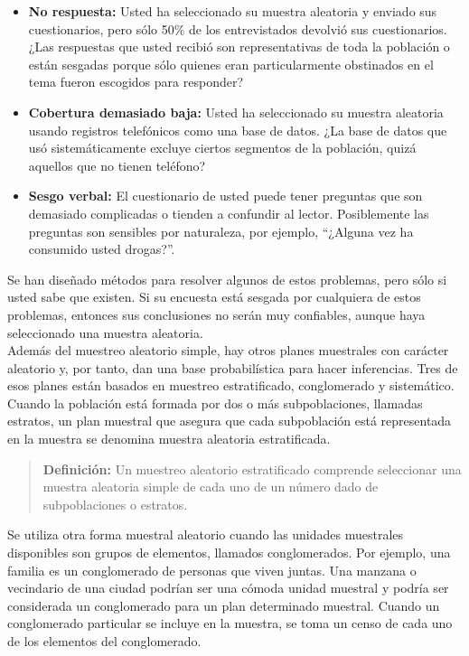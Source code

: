 \documentclass[]{article}
\begin{document}
\begin{itemize}
	\item \textbf{No respuesta:} Usted ha seleccionado su muestra aleatoria y enviado sus cuestionarios, pero sólo 50\% de los entrevistados devolvió sus cuestionarios. ¿Las respuestas que usted recibió son representativas de toda la población o están sesgadas porque sólo quienes eran particularmente obstinados en el tema fueron escogidos para responder?
	\item \textbf{Cobertura demasiado baja:} Usted ha seleccionado su muestra aleatoria usando registros telefónicos como una base de datos. ¿La base de datos que usó sistemáticamente excluye ciertos segmentos de la población, quizá aquellos que no tienen teléfono?
	\item \textbf{Sesgo verbal:} El cuestionario de usted puede tener preguntas que son demasiado complicadas o tienden a confundir al lector. Posiblemente las preguntas son sensibles por naturaleza, por ejemplo, “¿Alguna vez ha consumido usted drogas?”.
\end{itemize}
Se han diseñado métodos para resolver algunos de estos problemas, pero sólo si usted sabe que existen. Si su encuesta está sesgada por cualquiera de estos problemas, entonces sus conclusiones no serán muy confiables, aunque haya seleccionado una muestra aleatoria.
\\ Además del muestreo aleatorio simple, hay otros planes muestrales con carácter aleatorio y, por tanto, dan una base probabilística para hacer inferencias. Tres de esos planes están basados en muestreo estratificado, conglomerado y sistemático.
\\ Cuando la población está formada por dos o más subpoblaciones, llamadas estratos, un plan muestral que asegura que cada subpoblación está representada en la muestra se denomina muestra aleatoria estratificada.
\begin{quote}
	\textbf{Definición:} Un muestreo aleatorio estratificado comprende seleccionar una muestra aleatoria simple de cada uno de un número dado de subpoblaciones o estratos.
\end{quote}
Se utiliza otra forma muestral aleatorio cuando las unidades muestrales disponibles son grupos de elementos, llamados conglomerados. Por ejemplo, una familia es un conglomerado de personas que viven juntas. Una manzana o vecindario de una ciudad podrían ser una cómoda unidad muestral y podría ser considerada un conglomerado para un plan determinado muestral. Cuando un conglomerado particular se incluye en la muestra, se toma un censo de cada uno de los elementos del conglomerado.
\end{document}
